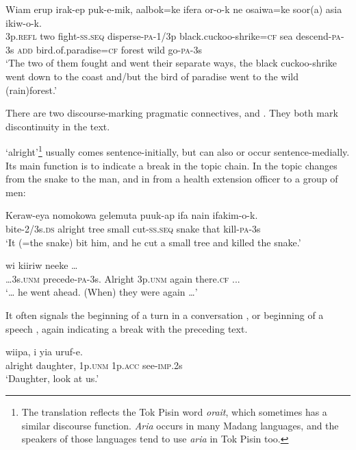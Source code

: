 \ea%
\label{ex:3:x1361}
\gll Wiam erup irak-ep puk-e-mik, aalbok=ke ifera or-o-k ne osaiwa=ke soor(a) asia ikiw-o-k.\\
3p.\textsc{refl} two fight-\textsc{ss}.\textsc{seq} disperse-\textsc{pa}-1/3p black.cuckoo-shrike=\textsc{cf} sea descend-\textsc{pa}-3s \textsc{add} bird.of.paradise=\textsc{cf} forest wild go-\textsc{pa}-3s\\
\glt`The two of them fought and went their separate ways, the black cuckoo-shrike went down to the coast and/but the bird of paradise went to the wild (rain)forest.'
\z

There are two discourse-marking pragmatic connectives,  and . They both mark discontinuity in the text.

 `alright'\footnote{The translation reflects the Tok Pisin word \textit{orait}, which sometimes has a similar discourse function. \textit{Aria} occurs in many Madang languages, and the speakers of those languages tend to use \textit{aria} in Tok Pisin too.} usually comes sentence-initially, but can also or occur sentence-medially. Its main function is to indicate a break in the topic chain. In  the topic changes from the snake to the man, and in  from a health extension officer to a group of men:

\ea%
\label{ex:3:x717}
\gll Keraw-eya  nomokowa gelemuta puuk-ap ifa nain ifakim-o-k.\\
bite-2/3s.\textsc{ds} alright tree small cut-\textsc{ss}.\textsc{seq} snake that kill-\textsc{pa}-3s\\
\glt`It (=the snake) bit him, and he cut a small tree and killed the snake.'
\z

\ea%
\label{ex:3:x718}
  wi kiiriw neeke {\dots} \\
{\dots}3s.\textsc{unm} precede-\textsc{pa}-3s. Alright 3p.\textsc{unm} again there.\textsc{cf} ...\\
\glt`{\dots} he went ahead. (When) they were  again {\dots}'
\z

It often signals the beginning of a turn in a conversation , or beginning of a speech , again indicating a break with the preceding text. 

\ea%
\label{ex:3:x721}
\gll {} wiipa, i yia uruf-e. \\
alright daughter, 1p.\textsc{unm} 1p.\textsc{acc} see-\textsc{imp}.2s\\
\glt`Daughter, look at us.'
\z

